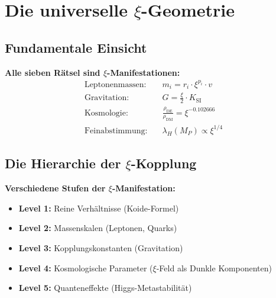 	\section{Die universelle $\xi$-Geometrie}
	\subsection{Fundamentale Einsicht}
	\textbf{Alle sieben Rätsel sind $\xi$-Manifestationen:}
	\begin{align}
		\text{Leptonenmassen:} &\quad m_i = r_i \cdot \xi^{p_i} \cdot v \\
		\text{Gravitation:} &\quad G = \frac{\xi}{2} \cdot K_{\text{SI}} \\
		\text{Kosmologie:} &\quad \frac{\rho_{\text{DE}}}{\rho_{\text{DM}}} = \xi^{-0.102666} \\
		\text{Feinabstimmung:} &\quad \lambda_H(M_P) \propto \xi^{1/4}
	\end{align}
	\subsection{Die Hierarchie der $\xi$-Kopplung}
	\textbf{Verschiedene Stufen der $\xi$-Manifestation:}
	\begin{itemize}
		\item \textbf{Level 1:} Reine Verhältnisse (Koide-Formel)
		\item \textbf{Level 2:} Massenskalen (Leptonen, Quarks)
		\item \textbf{Level 3:} Kopplungskonstanten (Gravitation)
		\item \textbf{Level 4:} Kosmologische Parameter ($\xi$-Feld als Dunkle Komponenten)
		\item \textbf{Level 5:} Quanteneffekte (Higgs-Metastabilität)
	\end{itemize}

